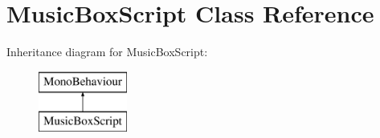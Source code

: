 \hypertarget{class_music_box_script}{}\section{Music\+Box\+Script Class Reference}
\label{class_music_box_script}
Inheritance diagram for Music\+Box\+Script\+:\begin{figure}[H]
\begin{center}
\leavevmode
\includegraphics[height=2.000000cm]{d6/deb/class_music_box_script}
\end{center}
\end{figure}
